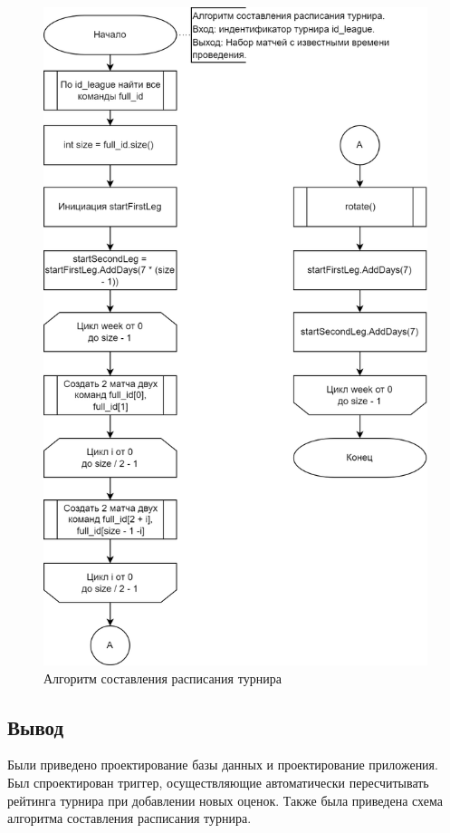 \begin{figure}[h]
	\centering
	\includegraphics[height=0.45\textheight]{img/schedule.png}
	\caption{Алгоритм составления расписания турнира}
	\label{img:schedule}
\end{figure}
\clearpage

\subsection*{Вывод}
Были приведено проектирование базы данных и проектирование приложения.
Был спроектирован триггер, осуществляющие автоматически пересчитывать рейтинга турнира при добавлении новых оценок.
Также была приведена схема алгоритма составления расписания турнира.